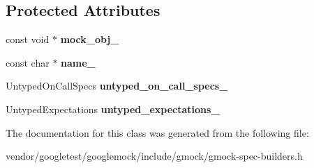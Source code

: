 \subsection*{Protected Attributes}
\begin{DoxyCompactItemize}
\item 
const void $\ast$ {\bfseries mock\+\_\+obj\+\_\+}\hypertarget{classtesting_1_1internal_1_1UntypedFunctionMockerBase_adf35c589969bb985668616031cb9ed56}{}\label{classtesting_1_1internal_1_1UntypedFunctionMockerBase_adf35c589969bb985668616031cb9ed56}

\item 
const char $\ast$ {\bfseries name\+\_\+}\hypertarget{classtesting_1_1internal_1_1UntypedFunctionMockerBase_a2d472077b9a8d3758caaec5770259f70}{}\label{classtesting_1_1internal_1_1UntypedFunctionMockerBase_a2d472077b9a8d3758caaec5770259f70}

\item 
Untyped\+On\+Call\+Specs {\bfseries untyped\+\_\+on\+\_\+call\+\_\+specs\+\_\+}\hypertarget{classtesting_1_1internal_1_1UntypedFunctionMockerBase_aed2a1913f6c03fd47c8900039556be34}{}\label{classtesting_1_1internal_1_1UntypedFunctionMockerBase_aed2a1913f6c03fd47c8900039556be34}

\item 
Untyped\+Expectations {\bfseries untyped\+\_\+expectations\+\_\+}\hypertarget{classtesting_1_1internal_1_1UntypedFunctionMockerBase_aae4a42a4bace1fcb0cd4bdf1ddd40277}{}\label{classtesting_1_1internal_1_1UntypedFunctionMockerBase_aae4a42a4bace1fcb0cd4bdf1ddd40277}

\end{DoxyCompactItemize}


The documentation for this class was generated from the following file\+:\begin{DoxyCompactItemize}
\item 
vendor/googletest/googlemock/include/gmock/gmock-\/spec-\/builders.\+h\end{DoxyCompactItemize}
